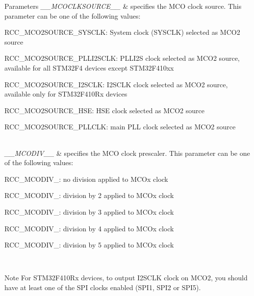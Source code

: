 \begin{DoxyParams}{Parameters}
{\em \+\_\+\+\_\+\+M\+C\+O\+C\+L\+K\+S\+O\+U\+R\+C\+E\+\_\+\+\_\+} & specifies the M\+CO clock source. This parameter can be one of the following values\+: \begin{DoxyItemize}
\item R\+C\+C\+\_\+\+M\+C\+O2\+S\+O\+U\+R\+C\+E\+\_\+\+S\+Y\+S\+C\+LK\+: System clock (S\+Y\+S\+C\+LK) selected as M\+C\+O2 source \item R\+C\+C\+\_\+\+M\+C\+O2\+S\+O\+U\+R\+C\+E\+\_\+\+P\+L\+L\+I2\+S\+C\+LK\+: P\+L\+L\+I2S clock selected as M\+C\+O2 source, available for all S\+T\+M32\+F4 devices except S\+T\+M32\+F410xx \item R\+C\+C\+\_\+\+M\+C\+O2\+S\+O\+U\+R\+C\+E\+\_\+\+I2\+S\+C\+LK\+: I2\+S\+C\+LK clock selected as M\+C\+O2 source, available only for S\+T\+M32\+F410\+Rx devices \item R\+C\+C\+\_\+\+M\+C\+O2\+S\+O\+U\+R\+C\+E\+\_\+\+H\+SE\+: H\+SE clock selected as M\+C\+O2 source \item R\+C\+C\+\_\+\+M\+C\+O2\+S\+O\+U\+R\+C\+E\+\_\+\+P\+L\+L\+C\+LK\+: main P\+LL clock selected as M\+C\+O2 source \end{DoxyItemize}
\\
\hline
{\em \+\_\+\+\_\+\+M\+C\+O\+D\+I\+V\+\_\+\+\_\+} & specifies the M\+CO clock prescaler. This parameter can be one of the following values\+: \begin{DoxyItemize}
\item R\+C\+C\+\_\+\+M\+C\+O\+D\+I\+V\+\_\+: no division applied to M\+C\+Ox clock \item R\+C\+C\+\_\+\+M\+C\+O\+D\+I\+V\+\_\+: division by 2 applied to M\+C\+Ox clock \item R\+C\+C\+\_\+\+M\+C\+O\+D\+I\+V\+\_\+: division by 3 applied to M\+C\+Ox clock \item R\+C\+C\+\_\+\+M\+C\+O\+D\+I\+V\+\_\+: division by 4 applied to M\+C\+Ox clock \item R\+C\+C\+\_\+\+M\+C\+O\+D\+I\+V\+\_\+: division by 5 applied to M\+C\+Ox clock \end{DoxyItemize}
\\
\hline
\end{DoxyParams}
\begin{DoxyNote}{Note}
For S\+T\+M32\+F410\+Rx devices, to output I2\+S\+C\+LK clock on M\+C\+O2, you should have at least one of the S\+PI clocks enabled (S\+P\+I1, S\+P\+I2 or S\+P\+I5). 
\end{DoxyNote}
